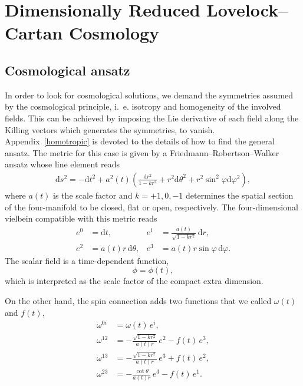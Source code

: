\documentclass[aps,prd,12pt,superscriptaddress,showpacs,showkeys,longbibliography,reprint,nofootinbib]{revtex4-1}
\begin{document}
\section{Dimensionally Reduced Lovelock--Cartan Cosmology\label{cosmos}}

\subsection{Cosmological ansatz}

In order to look for cosmological solutions, we demand the symmetries assumed by the cosmological principle, i.~e. isotropy and homogeneity of the involved fields. This can be achieved by imposing the Lie derivative of each field along the Killing vectors which generates the symmetries, to vanish. Appendix~\ref{homotropic} is devoted to the details of how to find the general ansatz.
The metric for this case is given by a Friedmann--Robertson--Walker ansatz whose line element reads
\begin{align*}
\text{d}s^2=-\text{d}t^2+a^2(t)\left(\frac{\text{d}r^2}{1-kr^2}+r^2\text{d}\theta^2+r^2\sin^2\varphi\text{d}\varphi^2\right),
\end{align*}
where $a(t)$ is the scale factor and $k=+1,0,-1$ determines the spatial section of the four-manifold to be closed, flat or open, respectively. The four-dimensional vielbein compatible with this metric reads
\begin{equation}
  \begin{aligned}
    \label{vielbein cosmo}
    e^0&=\mbox{d}t, & e^1&=\frac{a(t)}{\sqrt{1-kr^2}} \, \mbox{d}r,\\
    e^2&=a(t)r \, \mbox{d}\theta, & e^3&=a(t) r \sin\varphi \,\mbox{d}\varphi.
  \end{aligned}
\end{equation}
The scalar field is a time-dependent function, 
\begin{equation}
  \phi=\phi(t),
\end{equation}
which is interpreted as the scale factor of the compact extra dimension.

On the other hand, the spin connection adds two functions that we called $\omega(t)$ and $f(t)$,
\begin{align}
  \omega^{0i}&=\omega(t) \, e^i,\\
  \omega^{12}&=-\frac{\sqrt{1-kr^2}}{a(t)r} \, e^2 - f(t) \, e^3,\\
  \omega^{13}&=-\frac{\sqrt{1-kr^2}}{a(t)r} \, e^3 + f(t) \, e^2,\\
  \omega^{23}&=-\frac{\cot\theta}{a(t)r} \, e^3 - f(t) \, e^1.
\end{align}
\end{document}
